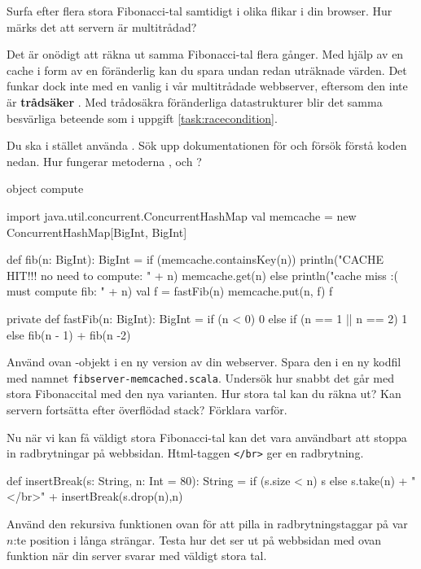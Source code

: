 \Subtask Surfa efter flera stora Fibonacci-tal samtidigt i olika flikar i din browser. Hur märks det att servern är multitrådad?


\Subtask Det är onödigt att räkna ut samma Fibonacci-tal flera gånger. Med hjälp av en cache i form av en föränderlig  kan du spara undan redan uträknade värden. Det funkar dock inte med en vanlig  i vår multitrådade webbserver, eftersom den inte är \textbf{trådsäker} . Med trådosäkra föränderliga datastrukturer blir det samma besvärliga beteende som i uppgift \ref{task:racecondition}.

Du ska i stället använda . Sök upp  dokumentationen för  och försök förstå koden nedan. Hur fungerar metoderna ,  och ?
\begin{Code}
object compute {
  import java.util.concurrent.ConcurrentHashMap
  val memcache = new ConcurrentHashMap[BigInt, BigInt]

  def fib(n: BigInt): BigInt =
    if (memcache.containsKey(n)) {
      println("CACHE HIT!!! no need to compute: " + n)
      memcache.get(n)
    } else {
      println("cache miss :( must compute fib:  " + n)
      val f = fastFib(n)
      memcache.put(n, f)
      f
    }

  private def fastFib(n: BigInt): BigInt = {
    if (n < 0) 0 else
    if (n == 1 || n == 2) 1
    else fib(n - 1) + fib(n -2)
  }
}
\end{Code}

\Subtask Använd ovan -objekt i en ny version av din webserver. Spara den i en ny kodfil med namnet \texttt{fibserver-memcached.scala}. Undersök hur snabbt det går med stora Fibonaccital med den nya varianten. Hur stora tal kan du räkna ut? Kan servern fortsätta efter överflödad stack? Förklara varför.

\Subtask Nu när vi kan få väldigt stora Fibonacci-tal kan det vara användbart att stoppa in radbrytningar på webbsidan. Html-taggen \texttt{</br>} ger en radbrytning.
\begin{Code}
  def insertBreak(s: String, n: Int = 80): String = {
    if (s.size < n) s
    else s.take(n) + "</br>" + insertBreak(s.drop(n),n)
  }
\end{Code}
Använd den rekursiva funktionen ovan för att pilla in radbrytningstaggar på var $n$:te position i långa strängar. Testa hur det ser ut på webbsidan med ovan funktion när din server svarar med väldigt stora tal.

